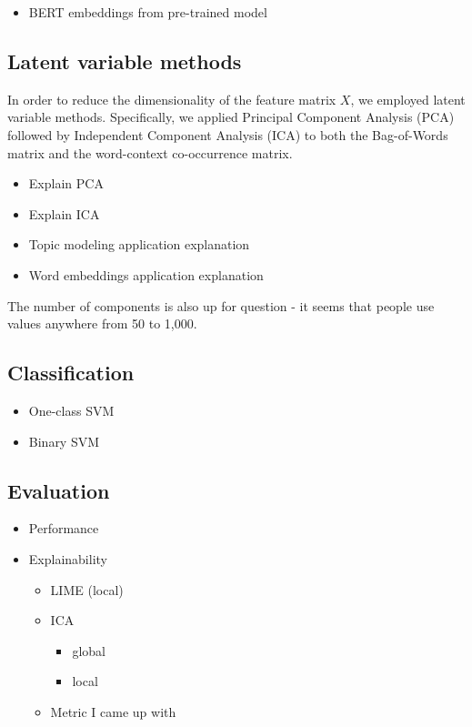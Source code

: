 \documentclass{article}
\begin{document}
\begin{itemize}
\tightlist
\item
  BERT embeddings from pre-trained model
\end{itemize}

\hypertarget{latent-variable-methods}{%
\subsection{Latent variable methods}\label{latent-variable-methods}}

In order to reduce the dimensionality of the feature matrix \(X\), we
employed latent variable methods. Specifically, we applied Principal
Component Analysis (PCA) followed by Independent Component Analysis
(ICA) to both the Bag-of-Words matrix and the word-context co-occurrence
matrix.

\begin{itemize}
\item
  Explain PCA
\item
  Explain ICA
\item
  Topic modeling application explanation
\item
  Word embeddings application explanation
\end{itemize}

The number of components is also up for question - it seems that people
use values anywhere from 50 to 1,000.

\hypertarget{classification}{%
\subsection{Classification}\label{classification}}

\begin{itemize}
\tightlist
\item
  One-class SVM
\item
  Binary SVM
\end{itemize}

\hypertarget{evaluation}{%
\subsection{Evaluation}\label{evaluation}}

\begin{itemize}
\tightlist
\item
  Performance
\item
  Explainability

  \begin{itemize}
  \tightlist
  \item
    LIME (local)
  \item
    ICA

    \begin{itemize}
    \tightlist
    \item
      global
    \item
      local
    \end{itemize}
  \item
    Metric I came up with
  \end{itemize}
\end{itemize}
\end{document}
